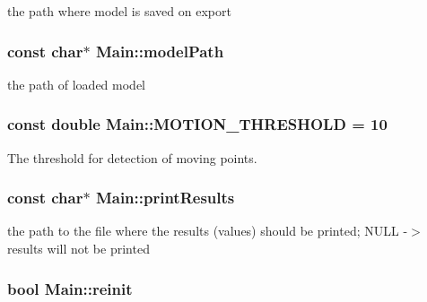the path where model is saved on export 

\hypertarget{classMain_a47ef2693d73c1e51a329a50040e20892}{
\subsubsection[{model\-Path}]{\setlength{\rightskip}{0pt plus 5cm}const char$\ast$ Main\-::model\-Path}}\label{classMain_a47ef2693d73c1e51a329a50040e20892}


the path of loaded model 

\hypertarget{classMain_a8c4026ea3fe03e95d7f5484f560f71bb}{
\subsubsection[{M\-O\-T\-I\-O\-N\-\_\-\-T\-H\-R\-E\-S\-H\-O\-L\-D}]{\setlength{\rightskip}{0pt plus 5cm}const double Main\-::\-M\-O\-T\-I\-O\-N\-\_\-\-T\-H\-R\-E\-S\-H\-O\-L\-D = 10\hspace{0.3cm}{\ttfamily [static]}}}\label{classMain_a8c4026ea3fe03e95d7f5484f560f71bb}


The threshold for detection of moving points. 

\hypertarget{classMain_af1797c9bbb3ff136bba623ced62b8454}{
\subsubsection[{print\-Results}]{\setlength{\rightskip}{0pt plus 5cm}const char$\ast$ Main\-::print\-Results}}\label{classMain_af1797c9bbb3ff136bba623ced62b8454}


the path to the file where the results (values) should be printed; N\-U\-L\-L -\/$>$ results will not be printed 

\hypertarget{classMain_aedcd2167cc4b32d974742b745e51c8fb}{
\subsubsection[{reinit}]{\setlength{\rightskip}{0pt plus 5cm}bool Main\-::reinit}}\label{classMain_aedcd2167cc4b32d974742b745e51c8fb}


